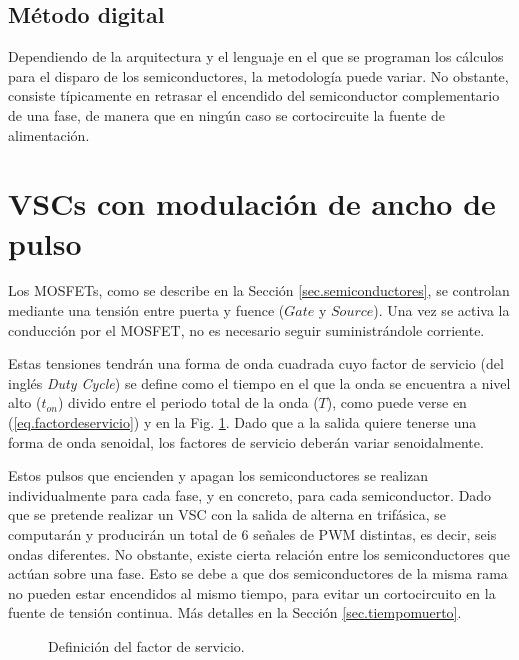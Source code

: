 \documentclass{report}
\begin{document}
\subsection{Método digital} \label{sec.metododigital}
Dependiendo de la arquitectura y el lenguaje en el que se programan los cálculos para el disparo de los semiconductores, la metodología puede variar. No obstante, consiste típicamente en retrasar el encendido del semiconductor complementario de una fase, de manera que en ningún caso se cortocircuite la fuente de alimentación.




\section{VSCs con modulación de ancho de pulso} \label{sec.controldesemiconductoresmediantePWM}

Los MOSFETs, como se describe en la Sección \ref{sec.semiconductores}, se controlan mediante una tensión entre puerta y fuence ($Gate$ y $Source$). Una vez se activa la conducción por el MOSFET, no es necesario seguir suministrándole corriente. 

Estas tensiones tendrán una forma de onda cuadrada cuyo factor de servicio (del inglés \textit{Duty Cycle}) se define como el tiempo en el que la onda se encuentra a nivel alto ($t_{on}$) divido entre el periodo total de la onda ($T$), como puede verse en (\ref{eq.factordeservicio}) y en la Fig. \ref{fig.factordeservicio}.
Dado que a la salida quiere tenerse una forma de onda senoidal, los factores de servicio deberán variar senoidalmente.

Estos pulsos que encienden y apagan los semiconductores se realizan individualmente para cada fase, y en concreto, para cada semiconductor. Dado que se pretende realizar un VSC con la salida de alterna en trifásica, se computarán y producirán un total de 6 señales de PWM distintas, es decir, seis ondas diferentes. No obstante, existe cierta relación entre los semiconductores que actúan sobre una fase. 
Esto se debe a que dos semiconductores de la misma rama no pueden estar encendidos al mismo tiempo, para evitar un cortocircuito en la fuente de tensión continua. Más detalles en la Sección \ref{sec.tiempomuerto}.



\begin{figure}[!h]
    \begin{center}
    \end{center}
    \caption{Definición del factor de servicio.}
    \label{fig.factordeservicio}
    \end{figure}
    
\end{document}
